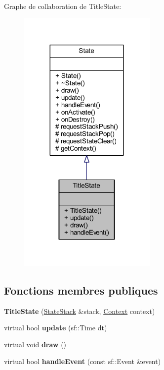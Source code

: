 Graphe de collaboration de Title\+State\+:\nopagebreak
\begin{figure}[H]
\begin{center}
\leavevmode
\includegraphics[width=191pt]{class_title_state__coll__graph}
\end{center}
\end{figure}
\subsection*{Fonctions membres publiques}
\begin{DoxyCompactItemize}
\item 
\hypertarget{class_title_state_a9fb6569d8ed77db85dcf8af2890c112c}{}\label{class_title_state_a9fb6569d8ed77db85dcf8af2890c112c} 
{\bfseries Title\+State} (\hyperlink{class_state_stack}{State\+Stack} \&stack, \hyperlink{struct_state_1_1_context}{Context} context)
\item 
\hypertarget{class_title_state_aa282ac0c6e22267cb6a7054973d75fdf}{}\label{class_title_state_aa282ac0c6e22267cb6a7054973d75fdf} 
virtual bool {\bfseries update} (sf\+::\+Time dt)
\item 
\hypertarget{class_title_state_ae12beafe5aad6929a56089942de1220e}{}\label{class_title_state_ae12beafe5aad6929a56089942de1220e} 
virtual void {\bfseries draw} ()
\item 
\hypertarget{class_title_state_a91c6ab4d741fe7445d88ed603001971a}{}\label{class_title_state_a91c6ab4d741fe7445d88ed603001971a} 
virtual bool {\bfseries handle\+Event} (const sf\+::\+Event \&event)
\end{DoxyCompactItemize}
